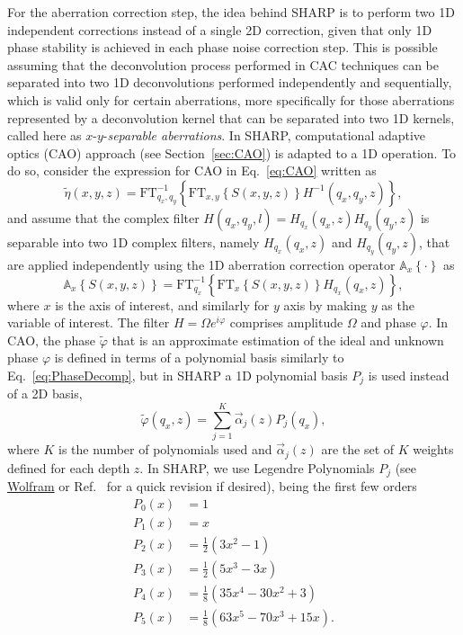 For the aberration correction step, the idea behind SHARP is to perform two 1D independent corrections instead of a single 2D correction, given that only 1D phase stability is achieved in each phase noise correction step. This is possible assuming that the deconvolution process performed in CAC techniques can be separated into two 1D deconvolutions performed independently and sequentially, which is valid only for certain aberrations, more specifically for those aberrations represented by a deconvolution kernel that can be separated into two 1D kernels, called here as $x$-$y$-\textit{separable aberrations}. In SHARP, computational adaptive optics (CAO) approach (see Section~\ref{sec:CAO}) is adapted to a 1D operation. To do so, consider the expression for CAO in Eq.~\eqref{eq:CAO} written as
\begin{equation}
    \tilde{\eta}(x,y,z) = \text{FT}^{-1}_{q_x,q_y}\left\{\text{FT}_{x,y}\left\{S(x,y,z)\right\}H^{-1}(q_x,q_y,z)\right\},
\end{equation}
and assume that the complex filter $H(q_x,q_y,l)=H_{q_x}(q_x,z)H_{q_y}(q_y,z)$ is separable into two 1D complex filters, namely $H_{q_x}(q_x,z)$ and $H_{q_y}(q_y,z)$, that are applied independently using the 1D aberration correction operator $\mathbb{A}_x\left\{\cdot\right\}$ as
\begin{equation}
    \mathbb{A}_x\left\{S(x,y,z)\right\} = \text{FT}^{-1}_{q_x}\left\{\text{FT}_{x}\left\{S(x,y,z)\right\}H_{q_x}(q_x,z)\right\},
\end{equation}
where $x$ is the axis of interest, and similarly for $y$ axis by making $y$ as the variable of interest. The filter $H = \Omega e^{i\varphi}$ comprises amplitude $\Omega$ and phase $\varphi$. In CAO, the phase $\tilde{\varphi}$ that is an approximate estimation of the ideal and unknown phase $\varphi$ is defined in terms of a polynomial basis similarly to Eq.~\eqref{eq:PhaseDecomp}, but in SHARP a 1D polynomial basis $P_j$ is used instead of a 2D basis,
\begin{equation}
    \tilde{\varphi}(q_x,z) = \sum_{j=1}^K\vec{\alpha}_j(z)P_j(q_x),
\end{equation}
where $K$ is the number of polynomials used and $\vec{\alpha}_j(z)$ are the set of $K$ weights defined for each depth $z$. In SHARP, we use Legendre Polynomials $P_j$ (see \href{https://mathworld.wolfram.com/LegendrePolynomial.html}{Wolfram} or Ref.~\cite{Arfken2013_Legendre} for a quick revision if desired), being the first few orders
\begin{align*}
    P_0(x) &= 1 \\
    P_1(x) &= x \\
    P_2(x) &= \frac{1}{2}(3x^2 - 1) \\
    P_3(x) &= \frac{1}{2}(5x^3 - 3x) \\
    P_4(x) &= \frac{1}{8}(35x^4 - 30x^2 + 3) \\
    P_5(x) &= \frac{1}{8}(63x^5 - 70x^3 + 15x).
\end{align*}

